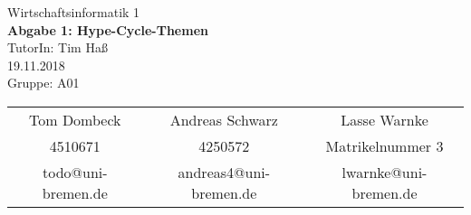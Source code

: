 \documentclass[12pt,utf8]{scrartcl}
\makeatletter
\newcommand{\teilnehmerI}{Tom Dombeck}
\newcommand{\mattI}{4510671}
\newcommand{\mailI}{todo@uni-bremen.de}
\newcommand{\teilnehmerII}{Andreas Schwarz}
\newcommand{\mattII}{4250572}
\newcommand{\mailII}{andreas4@uni-bremen.de}
\newcommand{\teilnehmerIII}{Lasse Warnke}
\newcommand{\mattIII}{Matrikelnummer 3}
\newcommand{\mailIII}{lwarnke@uni-bremen.de}
\newcommand{\thisgroup}{A01}
\newcommand{\abgabedatum}{19.11.2018}
\newcommand{\nummer}{1}
\newcommand{\thema}{Hype-Cycle-Themen}
\newcommand{\thistutor}{Tim Haß}
\newcommand{\thiscourse}{Wirtschaftsinformatik 1}
\makeatother
\begin{document}
\begin{titlepage}
	\vspace*{\baselineskip}		
	\centering					
	\LARGE							
	\thiscourse \\ 					
	\vspace{1cm}					
	{\Huge 							
	\textbf{Abgabe \nummer: \thema}} \\ 
	\vspace{1.5cm} 					
	TutorIn: \thistutor \\ 		
	\abgabedatum \\ 				
	\vfill 							
	Gruppe: \thisgroup \\ 			
	\vspace{.5cm} 					
	\large 							
	\begin{tabular}{c|c|c} 		
	\teilnehmerI	& \teilnehmerII & \teilnehmerIII \\ 
	\mattI	& \mattII &  \mattIII\\ 
	\mailI	& \mailII & \mailIII \\ 
	\end{tabular} 
\end{titlepage}
\end{document}
